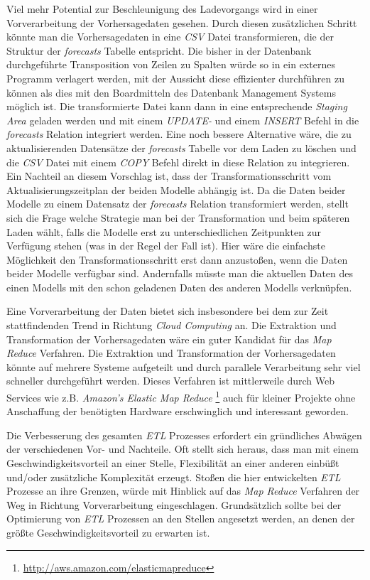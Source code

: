 Viel mehr Potential zur Beschleunigung des Ladevorgangs wird in einer
Vorverarbeitung der Vorhersagedaten gesehen. Durch diesen zusätzlichen
Schritt könnte man die Vorhersagedaten in eine \textit{CSV} Datei
transformieren, die der Struktur der \textit{forecasts} Tabelle
entspricht. Die bisher in der Datenbank durchgeführte Transposition
von Zeilen zu Spalten würde so in ein externes Programm verlagert
werden, mit der Aussicht diese effizienter durchführen zu können als
dies mit den Boardmitteln des Datenbank Management Systems möglich
ist. Die transformierte Datei kann dann in eine entsprechende
\textit{Staging Area} geladen werden und mit einem \textit{UPDATE-}
und einem \textit{INSERT} Befehl in die \textit{forecasts} Relation
integriert werden. Eine noch bessere Alternative wäre, die zu
aktualisierenden Datensätze der \textit{forecasts} Tabelle vor dem
Laden zu löschen und die \textit{CSV} Datei mit einem \textit{COPY}
Befehl direkt in diese Relation zu integrieren. Ein Nachteil an diesem
Vorschlag ist, dass der Transformationsschritt vom
Aktualisierungszeitplan der beiden Modelle abhängig ist. Da die Daten
beider Modelle zu einem Datensatz der \textit{forecasts} Relation
transformiert werden, stellt sich die Frage welche Strategie man bei
der Transformation und beim späteren Laden wählt, falls die Modelle
erst zu unterschiedlichen Zeitpunkten zur Verfügung stehen (was in der
Regel der Fall ist). Hier wäre die einfachste Möglichkeit den
Transformationsschritt erst dann anzustoßen, wenn die Daten beider
Modelle verfügbar sind. Andernfalls müsste man die aktuellen Daten des
einen Modells mit den schon geladenen Daten des anderen Modells
verknüpfen.

Eine Vorverarbeitung der Daten bietet sich insbesondere bei dem zur
Zeit stattfindenden Trend in Richtung \textit{Cloud Computing} an. Die
Extraktion und Transformation der Vorhersagedaten wäre ein guter
Kandidat für das \textit{Map Reduce} Verfahren. Die Extraktion und
Transformation der Vorhersagedaten könnte auf mehrere Systeme
aufgeteilt und durch parallele Verarbeitung sehr viel schneller
durchgeführt werden.  Dieses Verfahren ist mittlerweile durch Web
Services wie z.B. \textit{Amazon's Elastic Map Reduce}
\footnote{\url{http://aws.amazon.com/elasticmapreduce}} auch für
kleiner Projekte ohne Anschaffung der benötigten Hardware
erschwinglich und interessant geworden.

Die Verbesserung des gesamten \textit{ETL} Prozesses erfordert ein
gründliches Abwägen der verschiedenen Vor- und Nachteile. Oft stellt
sich heraus, dass man mit einem Geschwindigkeitsvorteil an einer
Stelle, Flexibilität an einer anderen einbüßt und/oder zusätzliche
Komplexität erzeugt. Stoßen die hier entwickelten \textit{ETL}
Prozesse an ihre Grenzen, würde mit Hinblick auf das \textit{Map
  Reduce} Verfahren der Weg in Richtung Vorverarbeitung
eingeschlagen. Grundsätzlich sollte bei der Optimierung von
\textit{ETL} Prozessen an den Stellen angesetzt werden, an denen der
größte Geschwindigkeitsvorteil zu erwarten ist.

